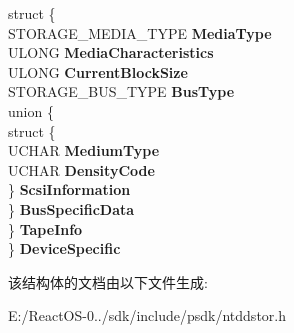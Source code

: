 \begin{DoxyCompactItemize}
\begin{tabbing}
\>struct \{\\
\>\>STORAGE\_MEDIA\_TYPE {\bfseries MediaType}\\
\>\>ULONG {\bfseries MediaCharacteristics}\\
\>\>ULONG {\bfseries CurrentBlockSize}\\
\>\>STORAGE\_BUS\_TYPE {\bfseries BusType}\\
\>\>union \{\\
\>\>\>struct \{\\
\>\>\>\>UCHAR {\bfseries MediumType}\\
\>\>\>\>UCHAR {\bfseries DensityCode}\\
\>\>\>\} {\bfseries ScsiInformation}\\
\>\>\} {\bfseries BusSpecificData}\\
\>\} {\bfseries TapeInfo}\\
\} {\bfseries DeviceSpecific}\\

\end{tabbing}\end{DoxyCompactItemize}


该结构体的文档由以下文件生成\+:\begin{DoxyCompactItemize}
\item 
E\+:/\+React\+O\+S-\/0../sdk/include/psdk/ntddstor.\+h\end{DoxyCompactItemize}
